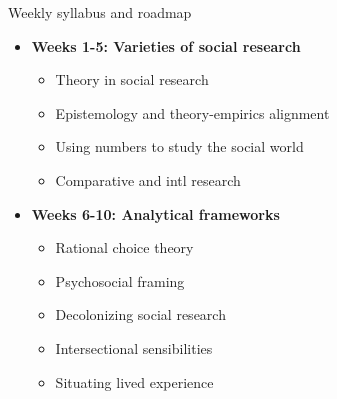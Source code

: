 \documentclass[
  10pt,
  ignorenonframetext,
]{beamer}
\begin{document}
\begin{frame}{Weekly syllabus and roadmap}
\protect\hypertarget{weekly-syllabus-and-roadmap}{}
\begin{itemize}
\small
  \item \textbf{Weeks 1-5: Varieties of social research}
  \vspace{0.1cm}
  \begin{itemize}
    \item Theory in social research
    \item Epistemology and theory-empirics alignment
    \item Using numbers to study the social world
    \item Comparative and intl research
  \end{itemize}
  \vspace{0.3cm}
  \item \textbf{Weeks 6-10: Analytical frameworks}
  \vspace{0.1cm}
  \begin{itemize}
    \item Rational choice theory
    \item Psychosocial framing
    \item Decolonizing social research
    \item Intersectional sensibilities
    \item Situating lived experience
  \end{itemize}
\end{itemize}
\end{frame}
\end{document}
